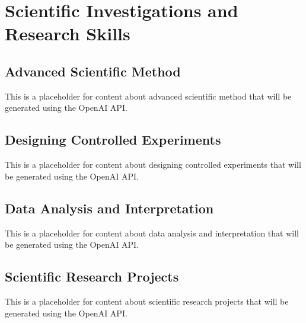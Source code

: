 \chapter{Scientific Investigations and Research Skills}


\section{Advanced Scientific Method}

This is a placeholder for content about advanced scientific method that will be generated using the OpenAI API.

\section{Designing Controlled Experiments}

This is a placeholder for content about designing controlled experiments that will be generated using the OpenAI API.

\section{Data Analysis and Interpretation}

This is a placeholder for content about data analysis and interpretation that will be generated using the OpenAI API.

\section{Scientific Research Projects}

This is a placeholder for content about scientific research projects that will be generated using the OpenAI API.